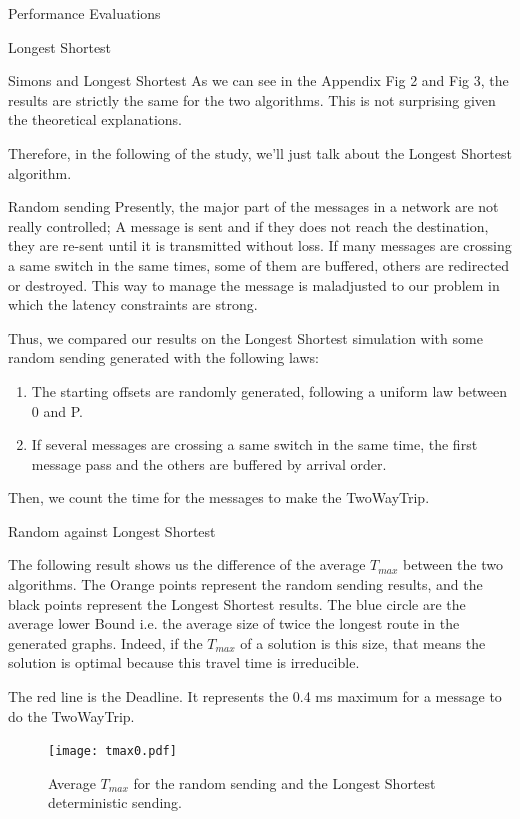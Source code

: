 \documentclass[a4paper,10pt]{report}
\begin{document}
\begin{chapter}{Performance Evaluations}
\begin{section}{Longest Shortest}
\begin{subsection}{Simons and Longest Shortest}
As we can see in the Appendix Fig 2 and Fig 3, the results are strictly the same for the two algorithms. This is not surprising given the
theoretical explanations.

Therefore, in the following of the study, we'll just talk about the Longest Shortest algorithm.
\end{subsection}


\begin{subsection}{Random sending}
Presently, the major part of the messages in a network are not really controlled; A message is sent and if they does not reach the destination,
they are re-sent until it is transmitted without loss. If many messages are crossing a same switch in the same times, some of them are buffered,
others are redirected or destroyed. This way to manage the message is maladjusted to our problem in which the latency constraints are strong.

Thus, we compared our results on the Longest Shortest simulation with some random sending generated with the following laws: 
\begin{enumerate}
 \item The starting offsets are randomly generated, following a uniform law between 0 and P.
 \item If several messages are crossing a same switch in the same time, the first message pass and the others are buffered by arrival order.
\end{enumerate}

Then, we count the time for the messages to make the TwoWayTrip.
\end{subsection}

\begin{subsection}{Random against Longest Shortest}
 
The following result shows us the difference of the average $T_{max}$ between the two algorithms.
The Orange points represent the random sending results, and the black points represent the Longest Shortest results.
The blue circle are the average lower Bound i.e. the average size of twice the longest route in the generated graphs.
Indeed, if the $T_{max}$ of a solution is this size, that means the solution is optimal because this travel time is irreducible.

The red line is the Deadline. It represents the 0.4 ms maximum for a message to do the TwoWayTrip.

\begin{figure}[H]
\hspace*{-3cm}
\centering
\texttt{[image: tmax0.pdf]}%
\caption{Average $T_{max}$ for the random sending and the Longest Shortest deterministic sending.}
\end{figure}


\end{subsection}
\end{section}
\end{chapter}
\end{document}
